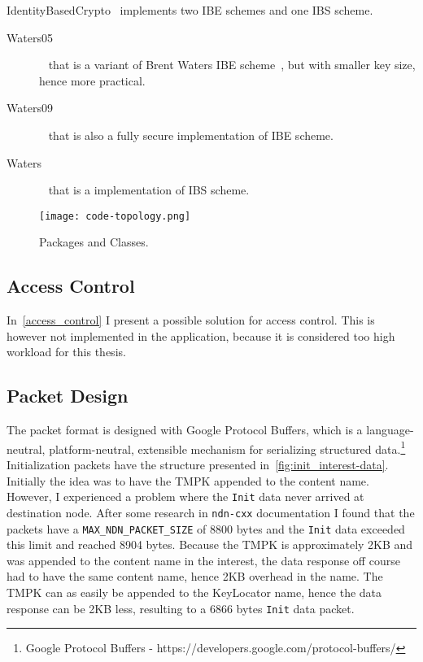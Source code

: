 IdentityBasedCrypto~\cite[identityBasedCrypto.py]{garseg15} implements two \gls{IBE} schemes and one \gls{IBS} scheme. 
\begin{description}
  \item[Waters05]~\cite{DBLP:journals/iacr/Naccache05} that is a variant of Brent Waters \gls{IBE} scheme~\cite{DBLP:journals/iacr/Waters04}, but with smaller key size, hence more practical.
  \item[Waters09]~\cite{DBLP:conf/crypto/Waters09} that is also a fully secure implementation of \gls{IBE} scheme.
  \item[Waters]~\cite{DBLP:journals/iacr/Waters04} that is a implementation of \gls{IBS} scheme.
\end{description}

\begin{figure}[ht]
  \centering
  \texttt{[image: code-topology.png]}
  \caption{Packages and Classes.}
  \label{fig:code-topology}
\end{figure}

\subsection{Access Control}
In~\autoref{access_control} I present a possible solution for access control.
This is however not implemented in the application, because it is considered too high workload for this thesis.

\subsection{Packet Design}
The packet format is designed with Google Protocol Buffers, which is a language-neutral, platform-neutral, extensible mechanism for serializing structured \gls{data}.\footnote{Google Protocol Buffers - https://developers.google.com/protocol-buffers/}
Initialization packets have the structure presented in~\autoref{fig:init_interest-data}.
Initially the idea was to have the \gls{TMPK} appended to the content \gls{name}. 
However, I experienced a problem where the \texttt{Init} \gls{data} never arrived at destination node. 
After some research in \texttt{ndn-cxx} documentation I found that the packets have a \texttt{MAX\_NDN\_PACKET\_SIZE} of 8800 bytes and the \texttt{Init} \gls{data} exceeded this limit and reached 8904 bytes.
Because the \gls{TMPK} is approximately 2\gls{KB} and was appended to the content \gls{name} in the \gls{interest}, the \gls{data} response off course had to have the same content \gls{name}, hence 2\gls{KB} overhead in the \gls{name}. 
The \gls{TMPK} can as easily be appended to the KeyLocator \gls{name}, hence the \gls{data} response can be 2\gls{KB} less, resulting to a 6866 bytes \texttt{Init} \gls{data} packet.

